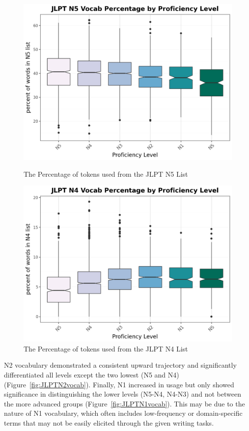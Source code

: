 \begin{figure}[htbp]
    \centering
    \begin{minipage}{.48\textwidth}
        \centering
    \includegraphics[scale=.4]{img/LFP/JLPT_N5}
    \caption[Percentage of tokens used from the JLPT N5 List]{The Percentage of tokens used from the JLPT N5 List}
        \label{fig:JLPTN5vocab}
    \end{minipage}
    \hfill
\begin{minipage}{.48\textwidth}
        \centering
        \includegraphics[scale=.4]{img/LFP/JLPT_N4}
        \caption[Percentage of tokens used from the JLPT N4 List]{The Percentage of tokens used from the JLPT N4 List}
\label{fig:JLPTN4vocab}
\end{minipage}
    \end{figure}
N2 vocabulary demonstrated a consistent upward trajectory and significantly differentiated all levels
except the two lowest (N5 and N4) (Figure~\ref{fig:JLPTN2vocab}). Finally, N1 increased in usage but only showed
significance in
distinguishing
the lower levels (N5-N4, N4-N3) and not between the more advanced groups (Figure~\ref{fig:JLPTN1vocab}). This
may be due to the nature
of N1 vocabulary, which often includes low-frequency or domain-specific terms that may not be easily elicited
through the given writing tasks. 

